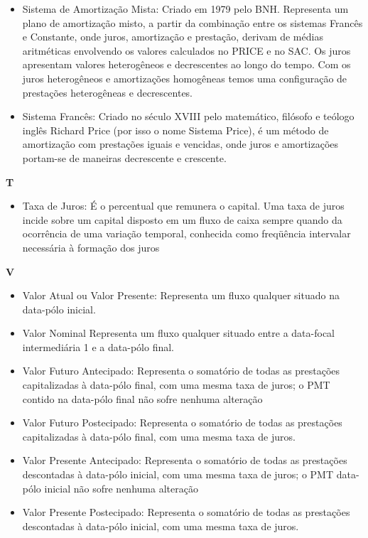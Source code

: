 \begin{itemize}
\item Sistema de Amortização Mista:
    Criado em 1979 pelo BNH. Representa um plano de amortização misto, a partir da combinação entre os sistemas Francês e Constante, onde juros, amortização e prestação, derivam de médias aritméticas envolvendo os valores calculados no PRICE e no SAC. Os juros apresentam valores heterogêneos e decrescentes ao longo do tempo. Com os juros heterogêneos e amortizações homogêneas temos uma configuração de prestações heterogêneas e decrescentes. 

\item Sistema Francês:
    Criado no século XVIII pelo matemático, filósofo e teólogo inglês Richard Price (por isso o nome Sistema Price), é um método de amortização com prestações iguais e vencidas, onde juros e amortizações portam-se de maneiras decrescente e crescente. 
\end{itemize}

\textbf{T}
\begin{itemize}
\item Taxa de Juros:
    É o percentual que remunera o capital. Uma taxa de juros incide sobre um capital disposto em um fluxo de caixa sempre quando da ocorrência de uma variação temporal, conhecida como freqüência intervalar necessária à formação dos juros 
\end{itemize}

\textbf{V}
\begin{itemize}
 \item Valor Atual ou Valor Presente:
    Representa um fluxo qualquer situado na data-pólo inicial. 

\item Valor Nominal
    Representa um fluxo qualquer situado entre a data-focal intermediária 1 e a data-pólo final. 

\item Valor Futuro Antecipado:
    Representa o somatório de todas as prestações capitalizadas à data-pólo final, com uma mesma taxa de juros; o PMT contido na data-pólo final não sofre nenhuma alteração 

\item Valor Futuro Postecipado:
    Representa o somatório de todas as prestações capitalizadas à data-pólo final, 
com uma mesma taxa de juros.

\item Valor Presente Antecipado:
    Representa o somatório de todas as prestações descontadas à data-pólo inicial, com uma mesma taxa de juros; o PMT data-pólo inicial não sofre nenhuma alteração 

\item Valor Presente Postecipado:
    Representa o somatório de todas as prestações descontadas à data-pólo inicial, com uma mesma taxa de juros. 
\end{itemize}